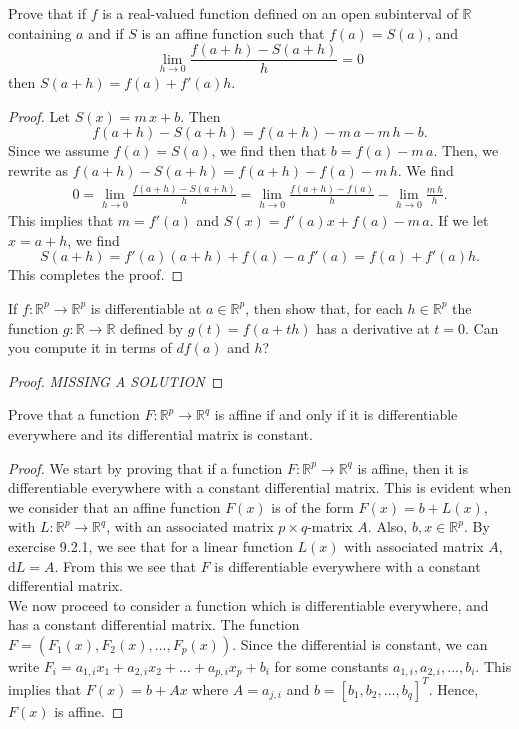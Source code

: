 \documentclass[12pt]{book}
\newcommand{\R}{\mathbb{R}}
\newenvironment{exercise}[2][Exercise]{\begin{trivlist}
\item[\hskip \labelsep {\bfseries #1}\hskip \labelsep {\bfseries #2.}]}{\end{trivlist}}
\begin{document}
\begin{exercise}{9.2.7}
	Prove that if $f$ is a real-valued function defined on an open subinterval of $\R$ containing $a$ and if $S$ is an affine function such that $f(a) = S(a)$, and 
		\[ \lim_{h \to 0} \frac{f(a+h) - S(a+h)}{h} = 0 \]
	then $S(a+h) = f(a) + f'(a) h$.
	
	\begin{proof}
	Let $S(x)= m\,x + b $. Then 
	    \[ f(a+h)  - S(a+h) = f(a+h) - m\,a - m\,h - b. \]
	Since we assume $f(a)=S(a)$, we find then that $ b = f(a) - m \,a $. Then, we rewrite as $f(a+h) - S(a+h) = f(a+h) - f(a) - m\,h $. We find
	  \begin{align*}
	    0 = \lim_{h \to 0} \frac{f(a+h)-S(a+h)}{h} = \lim_{h \to 0} \frac{f(a+h) - f(a)}{h} - \lim_{h \to 0} \frac{m\,h}{h}. 
	  \end{align*}
	This implies that $m = f'(a)$ and $S(x) = f'(a) x + f(a) - m\,a$. If we let $x= a+h$, we find 
	    \[ S(a+h) = f'(a) (a+h) + f(a) - a\, f'(a) = f(a) + f'(a)h. \]
	This completes the proof.
	\end{proof}
\end{exercise}


\begin{exercise}{9.2.11}
	If $f : \R^p \to \R^p$ is differentiable at $a \in \R^p$, then show that, for each $h \in \R^p$ the function $g: \R \to \R$ defined by $g(t) = f(a + t h)$ has a derivative at $t = 0$. Can you compute it in terms of $d f(a) $ and $h$?

	\begin{proof}
	\emph{MISSING A SOLUTION}
	\end{proof}
\end{exercise}


\begin{exercise}{9.2.12}
	Prove that a function $F: \R^p \to \R^q$ is affine if and only if it is differentiable everywhere and its differential matrix is constant. 
	
	\begin{proof}
    We start by proving that if a function $F: \R^p \to \R^q$ is affine, then it is differentiable everywhere with a constant differential matrix. This is evident when we consider that an affine function $F(x)$ is of the form $F(x) = b + L(x)$, with $L: \R^p \to \R^q$, with an associated matrix $p \times q$-matrix $A$. Also, $b,x \in \R^p$. By exercise 9.2.1, we see that for a linear function $L(x)$ with associated matrix $A$, $\text{d}L=A$. From this we see that $F$ is differentiable everywhere with a constant differential matrix. \\
    We now proceed to consider a function which is differentiable everywhere, and has a constant differential matrix. The function $F = (F_1(x), F_2(x), \hdots, F_p (x) )$. Since the differential is constant, we can write $F_i= a_{1,i} x_1 + a_{2,i} x_2 + \hdots + a_{p,i} x_p + b_i $ for some constants $a_{1,i}, a_{2,i}, ..., b_i$. This implies that $F(x) = b + A x$ where $A=a_{j,i}$ and $b = [b_1, b_2, \hdots, b_q ]^T$. Hence, $F(x)$ is affine.
	\end{proof}
\end{exercise}
\end{document}
